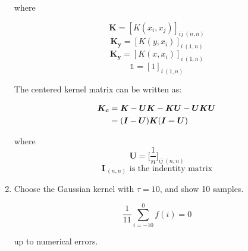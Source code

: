 \documentclass{article}
\begin{document}
\begin{enumerate}
        where  
        
        \[\bm{K} = [K(x_i,x_j)]_{ij\ (n,n)}\] 
        \[\bm{K_y} = [K(y,x_i)]_{i\ (1,n)}\]
        \[\bm{K_y} = [K(x,x_i)]_{i\ (1,n)}\]
        \[\mathbb{1} = [1]_{i\ (1,n)}\]
        
        The centered kernel matrix can be written as: 
        
        \begin{equation} 
            \begin{aligned}
                \bm{K_c} &= \bm{K} - \bm{UK} - \bm{KU} - \bm{UKU} \\
                &= (\bm{I} - \bm{U})\bm{K}(\bm{I-U}) \notag
            \end{aligned}
        \end{equation}

        where 
        \[\bm{U} = \bigg[\frac{1}{n}\bigg]_{ij\ (n,n)}\]
        \[\bm{I}_{\ (n,n)} \mbox{ is the indentity matrix}\]

    \item Choose the Gaussian kernel with $\tau=10$, and show 10 samples. 
        
        \begin{equation}
            \frac{1}{11}\sum_{i=-10}^0 f(i)=0
        \end{equation}
        
        up to numerical errors.  



\end{enumerate}
\end{document}

